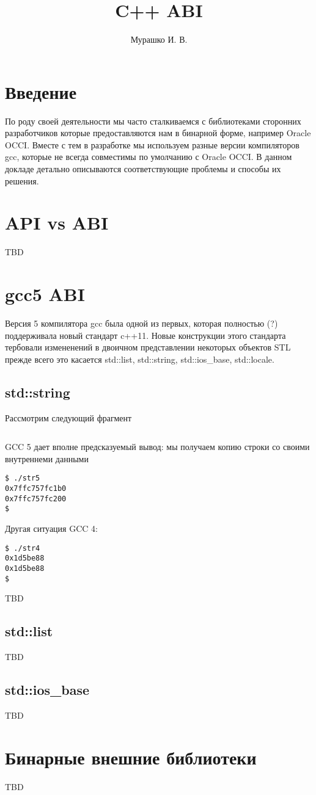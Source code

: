 \documentclass[14pt,a4paper]{article}
\title{C++ ABI}
\author{Мурашко И. В.}
\date{}
\begin{document}
\Russian

\maketitle

\section*{Введение}
По роду своей деятельности мы часто сталкиваемся с библиотеками сторонних 
разработчиков которые предоставляются нам в бинарной форме, например 
Oracle OCCI. Вместе с тем в разработке мы используем разные версии 
компиляторов gcc, которые не всегда совместимы по умолчанию с Oracle OCCI. 
В данном докладе детально описываются соответствующие проблемы и способы 
их решения. 

\section{API vs ABI}

TBD

\section{gcc5 ABI}

Версия 5 компилятора gcc была одной из первых, которая полностью (?)
поддерживала новый стандарт c++11. Новые конструкции этого стандарта
тербовали измененений в двоичном представлении некоторых объектов STL
прежде всего это касается std::list, std::string, std::ios\_base,
std::locale. 

\subsection{std::string}

Рассмотрим следующий фрагмент
\inputminted{c++}{./src/str.cpp}

GCC 5 дает вполне предсказуемый вывод: мы получаем копию строки со
своими внутреннеми данными
\begin{verbatim}
$ ./str5
0x7ffc757fc1b0
0x7ffc757fc200
$
\end{verbatim}

Другая ситуация GCC 4:
\begin{verbatim}
$ ./str4
0x1d5be88
0x1d5be88
$
\end{verbatim}


TBD

\subsection{std::list}

TBD

\subsection{std::ios\_base}

TBD

\section{Бинарные внешние библиотеки}

TBD
\end{document}
